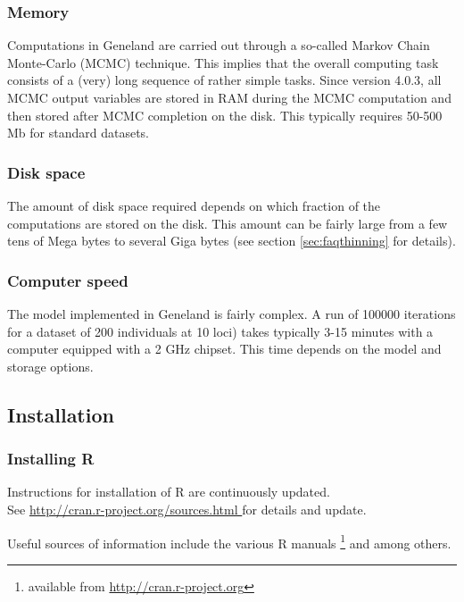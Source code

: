 \documentclass{article}
\begin{document}
\subsubsection{Memory}
Computations in {\sc Geneland} are carried out through a so-called Markov Chain Monte-Carlo (MCMC) technique. This implies that the 
overall computing task consists of a (very) long sequence of rather simple tasks. %
Since version 4.0.3, all MCMC output variables are stored in RAM during the MCMC computation and then stored after MCMC completion on the disk. 
This typically requires 50-500 Mb for standard datasets.

\subsubsection{Disk space}
The amount of disk space required depends on which fraction of the computations are stored on the disk. 
This amount can be fairly large from a few tens of Mega bytes to several Giga bytes 
(see section \ref{sec:faqthinning} for details). 

\subsubsection{Computer speed}
The model implemented in {\sc Geneland} is fairly complex. A  run of 100000 iterations for a dataset of 200 individuals at 10 loci) 
takes typically 3-15 minutes with a computer equipped with a 2 GHz chipset. This time depends on the 
model and storage options.

\subsection{Installation}

\subsubsection{Installing R}
Instructions for installation of R are continuously updated.\\
See \url{ http://cran.r-project.org/sources.html } for details and update.
 

Useful sources of information include the various R manuals \footnote{available from \url{http://cran.r-project.org}} and 
\citep{Paradis05,Paradis06} among others.
 
\end{document}
